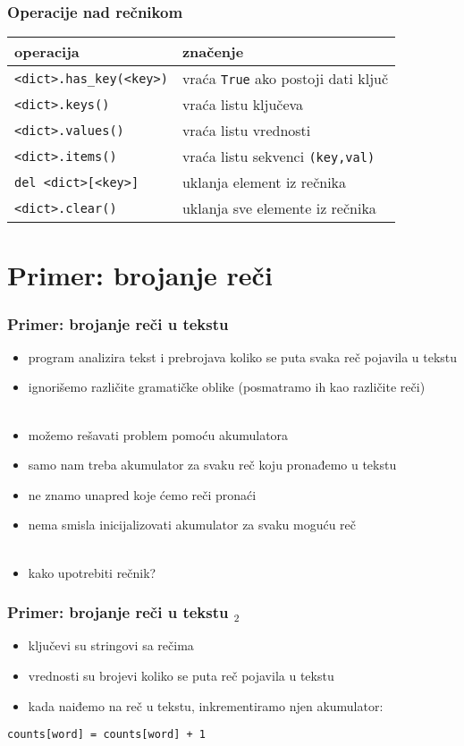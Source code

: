 \documentclass[utf8,compress]{beamer}
\begin{document}
\begin{frame}[fragile]
  \frametitle{Operacije nad rečnikom}
\begin{center}
\begin{tabular}{l|l}
\textbf{operacija} & \textbf{značenje} \\ \hline
\texttt{<dict>.has\_key(<key>)} & vraća \texttt{True} ako postoji dati ključ \\
\texttt{<dict>.keys()} & vraća listu ključeva \\
\texttt{<dict>.values()} & vraća listu vrednosti \\
\texttt{<dict>.items()} & vraća listu sekvenci \texttt{(key,val)} \\
\texttt{del <dict>[<key>]} & uklanja element iz rečnika \\
\texttt{<dict>.clear()} & uklanja sve elemente iz rečnika
\end{tabular}
\end{center}
\end{frame}

\section[Primer]{Primer: brojanje reči}

\begin{frame}[fragile]
  \frametitle{Primer: brojanje reči u tekstu}
  \begin{itemize}
    \item program analizira tekst i prebrojava koliko se puta svaka reč pojavila u tekstu
    \item ignorišemo različite gramatičke oblike (posmatramo ih kao različite reči) \\ \ \\
    \item možemo rešavati problem pomoću akumulatora
    \item samo nam treba akumulator za svaku reč koju pronađemo u tekstu
    \item ne znamo unapred koje ćemo reči pronaći
    \item nema smisla inicijalizovati akumulator za svaku moguću reč \\ \ \\
    \item kako upotrebiti rečnik?
  \end{itemize}
\end{frame}

\begin{frame}[fragile]
  \frametitle{Primer: brojanje reči u tekstu $_2$}
  \begin{itemize}
    \item ključevi su stringovi sa rečima
    \item vrednosti su brojevi koliko se puta reč pojavila u tekstu
    \item kada naiđemo na reč u tekstu, inkrementiramo njen akumulator:
  \end{itemize}
\begin{verbatim}
counts[word] = counts[word] + 1
\end{verbatim}
\end{frame}
\end{document}
